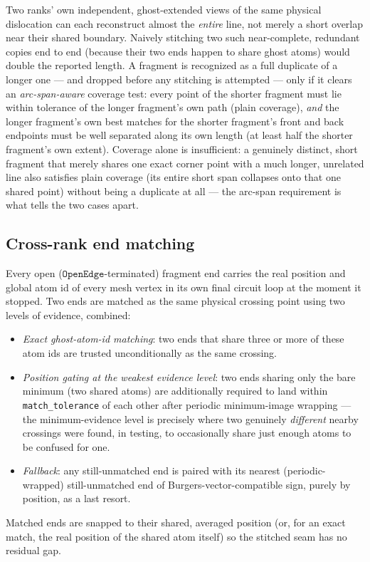 \documentclass[11pt,a4paper]{article}
\newcommand{\code}[1]{\texttt{#1}}
\begin{document}
Two ranks' own independent, ghost-extended views of the same physical dislocation can each
reconstruct almost the \emph{entire} line, not merely a short overlap near their shared boundary.
Naively stitching two such near-complete, redundant copies end to end (because their two ends
happen to share ghost atoms) would double the reported length. A fragment is recognized as a full
duplicate of a longer one — and dropped before any stitching is attempted — only if it clears an
\emph{arc-span-aware} coverage test: every point of the shorter fragment must lie within tolerance
of the longer fragment's own path (plain coverage), \emph{and} the longer fragment's own best
matches for the shorter fragment's front and back endpoints must be well separated along its own
length (at least half the shorter fragment's own extent). Coverage alone is insufficient: a
genuinely distinct, short fragment that merely shares one exact corner point with a much longer,
unrelated line also satisfies plain coverage (its entire short span collapses onto that one shared
point) without being a duplicate at all — the arc-span requirement is what tells the two cases
apart.

\subsection{Cross-rank end matching}

Every open ($\code{OpenEdge}$-terminated) fragment end carries the real position and global atom
id of every mesh vertex in its own final circuit loop at the moment it stopped. Two ends are
matched as the same physical crossing point using two levels of evidence, combined:
\begin{itemize}[nosep]
  \item \emph{Exact ghost-atom-id matching}: two ends that share three or more of these atom ids
    are trusted unconditionally as the same crossing.
  \item \emph{Position gating at the weakest evidence level}: two ends sharing only the bare
    minimum (two shared atoms) are additionally required to land within \code{match\_tolerance}
    of each other after periodic minimum-image wrapping — the minimum-evidence level is precisely
    where two genuinely \emph{different} nearby crossings were found, in testing, to occasionally
    share just enough atoms to be confused for one.
  \item \emph{Fallback}: any still-unmatched end is paired with its nearest (periodic-wrapped)
    still-unmatched end of Burgers-vector-compatible sign, purely by position, as a last resort.
\end{itemize}
Matched ends are snapped to their shared, averaged position (or, for an exact match, the real
position of the shared atom itself) so the stitched seam has no residual gap.
\end{document}
